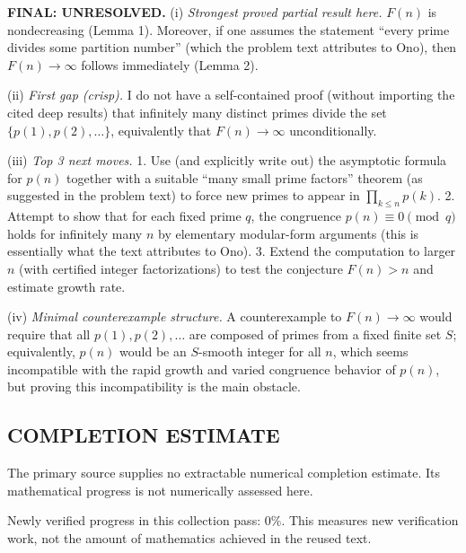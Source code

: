 \medskip
\noindent\textbf{FINAL: \textbf{UNRESOLVED}.}
(i) \emph{Strongest proved partial result here.} $F(n)$ is nondecreasing (Lemma 1). Moreover, if one assumes the statement ``every prime divides some partition number'' (which the problem text attributes to Ono), then $F(n)\to\infty$ follows immediately (Lemma 2).

(ii) \emph{First gap (crisp).} I do not have a self-contained proof (without importing the cited deep results) that infinitely many distinct primes divide the set $\{p(1),p(2),\dots\}$, equivalently that $F(n)\to\infty$ unconditionally.

(iii) \emph{Top 3 next moves.}
1. Use (and explicitly write out) the asymptotic formula for $p(n)$ together with a suitable ``many small prime factors'' theorem (as suggested in the problem text) to force new primes to appear in $\prod_{k\le n}p(k)$.
2. Attempt to show that for each fixed prime $q$, the congruence $p(n)\equiv 0\pmod q$ holds for infinitely many $n$ by elementary modular-form arguments (this is essentially what the text attributes to Ono).
3. Extend the computation to larger $n$ (with certified integer factorizations) to test the conjecture $F(n)>n$ and estimate growth rate.

(iv) \emph{Minimal counterexample structure.} A counterexample to $F(n)\to\infty$ would require that all $p(1),p(2),\dots$ are composed of primes from a fixed finite set $S$; equivalently, $p(n)$ would be an $S$-smooth integer for all $n$, which seems incompatible with the rapid growth and varied congruence behavior of $p(n)$, but proving this incompatibility is the main obstacle.


\subsection*{COMPLETION ESTIMATE}
The primary source supplies no extractable numerical completion estimate. Its mathematical progress is not numerically assessed here.

Newly verified progress in this collection pass: $0\%$. This measures new verification work, not the amount of mathematics achieved in the reused text.
